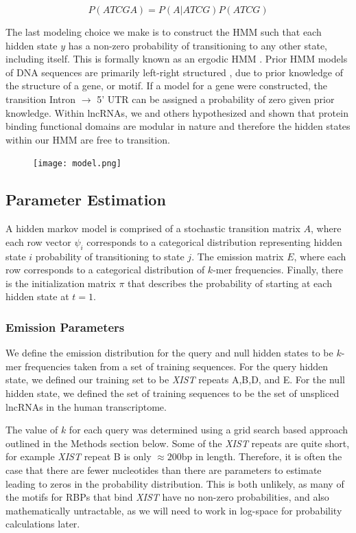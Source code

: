 $$P(ATCGA) = P(A|ATCG)P(ATCG)$$

The last modeling choice we make is to construct the HMM such that each hidden state $y$ has a non-zero probability of transitioning to any other state, including itself. This is formally known as an ergodic HMM \cite{Rabiner1989ARecognition}. Prior HMM models of DNA sequences are primarily left-right structured \cite{Burge1997PredictionDNA,Pachter2002ApplicationsProblems,Henderson1997FindingModel,Wheeler2013Nhmmer:HMMs}, due to prior knowledge of the structure of a gene, or motif. If a model for a gene were constructed, the transition Intron $\rightarrow$ 5' UTR can be assigned a probability of zero given prior knowledge. Within lncRNAs, we and others hypothesized and shown that protein binding functional domains are modular in nature and therefore the hidden states within our HMM are free to transition.

\begin{figure}[h]
\centering
\texttt{[image: model.png]}
\caption{}
\end{figure}

\subsection{Parameter Estimation}
A hidden markov model is comprised of a stochastic transition matrix $A$, where each row vector $\psi_i$ corresponds to a categorical distribution representing hidden state $i$ probability of transitioning to state $j$. The emission matrix $E$, where each row corresponds to a categorical distribution of $k$-mer frequencies. Finally, there is the initialization matrix $\pi$ that describes the probability of starting at each hidden state at $t=1$.
\subsubsection{Emission Parameters}
We define the emission distribution for the query and null hidden states to be $k$-mer frequencies taken from a set of training sequences. For the query hidden state, we defined our training set to be \emph{XIST} repeats A,B,D, and E. For the null hidden state, we defined the set of training sequences to be the set of unspliced lncRNAs in the human transcriptome. 

The value of $k$ for each query was determined using a grid search based approach outlined in the Methods section below. Some of the \emph{XIST} repeats are quite short, for example \emph{XIST} repeat B is only $\approx 200$bp in length. Therefore, it is often the case that there are fewer nucleotides than there are parameters to estimate leading to zeros in the probability distribution. This is both unlikely, as many of the motifs for RBPs that bind \emph{XIST} have no non-zero probabilities, and also mathematically untractable, as we will need to work in log-space for probability calculations later.

